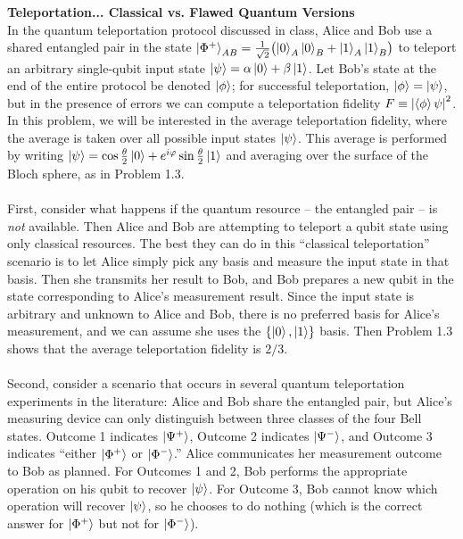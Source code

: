 \documentclass[12pt,letterpaper,boxed,cm]{hmcpset}
\newcommand{\abs}[1]{\left| #1 \right|}
\begin{document}
\begin{solution}
    \vfill
\end{solution}
\newpage

\begin{problem}[4.]
    \textbf{Teleportation... Classical vs. Flawed Quantum Versions}\\
    In the quantum teleportation protocol discussed in class, Alice and Bob use a shared entangled pair in the state $\ket{\Phi^+}_{AB} = \frac{1}{\sqrt{2}}\bigl(\ket{0}_A\ket{0}_B + \ket{1}_A\ket{1}_B\bigr)$ to teleport an arbitrary single-qubit input state $\ket{\psi} = \alpha\ket{0} + \beta\ket{1}$.  Let Bob's state at the end of the entire protocol be denoted $\ket{\phi}$; for successful teleportation, $\ket{\phi}=\ket{\psi}$, but in the presence of errors we can compute a teleportation fidelity $F \equiv \abs{\braket{\phi}{\psi}}^2$.  In this problem, we will be interested in the average teleportation fidelity, where the average is taken over all possible input states $\ket{\psi}$.  This average is performed by writing $\ket{\psi}=\cos\frac{\theta}{2}\ket{0}+e^{i\varphi}\sin\frac{\theta}{2}\ket{1}$ and averaging over the surface of the Bloch sphere, as in Problem 1.3.
    \\
    \\
    First, consider what happens if the quantum resource -- the entangled pair -- is \textit{not} available.  Then Alice and Bob are attempting to teleport a qubit state using only classical resources.  The best they can do in this ``classical teleportation'' scenario is to let Alice simply pick any basis and measure the input state in that basis.  Then she transmits her result to Bob, and Bob prepares a new qubit in the state corresponding to Alice's measurement result.  Since the input state is arbitrary and unknown to Alice and Bob, there is no preferred basis for Alice's measurement, and we can assume she uses the $\{\ket{0},\ket{1}\}$ basis.  Then Problem 1.3 shows that the average teleportation fidelity is $2/3$.
    \\
    \\
    Second, consider a scenario that occurs in several quantum teleportation experiments in the literature:  Alice and Bob share the entangled pair, but Alice's measuring device can only distinguish between three classes of the four Bell states.  Outcome 1 indicates $\ket{\Psi^+}$, Outcome 2 indicates $\ket{\Psi^-}$, and Outcome 3 indicates ``either $\ket{\Phi^+}$ or $\ket{\Phi^-}$.''  Alice communicates her measurement outcome to Bob as planned.  For Outcomes 1 and 2, Bob performs the appropriate operation on his qubit to recover $\ket{\psi}$.  For Outcome 3, Bob cannot know which operation will recover $\ket{\psi}$, so he chooses to do nothing (which is the correct answer for $\ket{\Phi^+}$ but not for $\ket{\Phi^-}$).

\end{problem}
\end{document}
